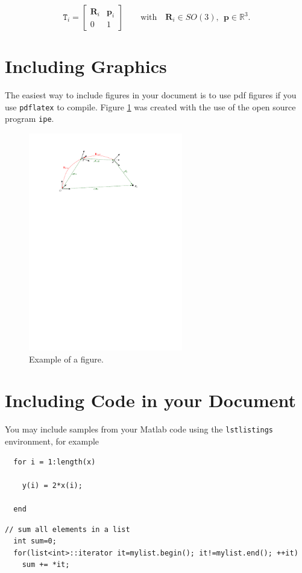   \begin{equation}\label{eq:se3}
    \mathtt{T}_i = \begin{bmatrix}\mathbf{R}_i & \mathbf{p}_i \\ 0 & 1\end{bmatrix} \qquad \text{with} \quad \mathbf{R}_i \in SO(3), \ \ \mathbf{p} \in \mathbb{R}^3.
  \end{equation}

\section{Including Graphics}\label{sec:epsgraph}
  The easiest way to include figures in your document is to use pdf figures if you use \texttt{pdflatex} to compile. Figure \ref{img:notation} was created with the use of the open source program \texttt{ipe}.

  \begin{figure}[h]
     \centering
     \includegraphics[width=0.6\textwidth]{img/notation.pdf}
     \caption{Example of a figure.}
     \label{img:notation}
  \end{figure}


\section{Including Code in your Document}

  You may include samples from your Matlab code using the \texttt{lstlistings} environment, for example
  \lstset{language=Matlab,numbers=none}
  \begin{lstlisting}[frame=lines, caption=Matlab Example, label=matlabexample]
  % Evaluate y = 2x
  for i = 1:length(x)

    y(i) = 2*x(i);

  end
  \end{lstlisting}

  \lstset{language=C++,numbers=none,caption=C++ Example, label=cppexample}
  \begin{lstlisting}[frame=lines]
  // sum all elements in a list
  int sum=0;
  for(list<int>::iterator it=mylist.begin(); it!=mylist.end(); ++it)
    sum += *it;
  \end{lstlisting}
